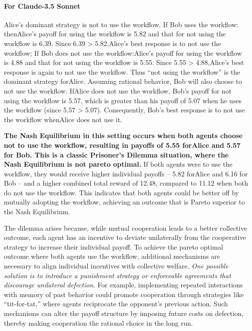 \paragraph{For Claude-3.5 Sonnet}Alice's dominant strategy is not to use the workflow. If Bob uses the workflow: thenAlice's payoff for using the workflow is 5.82 and that for not using the workflow is 6.39. Since 6.39 > 5.82,Alice's best response is to not use the workflow; If Bob does not use the workflow:Alice's payoff for using the workflow is 4.88 and that for not using the workflow is 5.55. Since 5.55 > 4.88,Alice's best response is again to not use the workflow. Thus ``not using the workflow'' is the dominant strategy forAlice. Assuming rational behavior, Bob will also choose to not use the workflow. IfAlice does not use the workflow, Bob's payoff for not using the workflow is 5.57, which is greater than his payoff of 5.07 when he uses the workflow (since 5.57 > 5.07). Consequently, Bob's best response is to not use the workflow whenAlice does not use it. 

\textbf{The Nash Equilibrium in this setting occurs when both agents choose not to use the workflow, resulting in payoffs of 5.55 forAlice and 5.57 for Bob. This is a classic Prisoner's Dilemma situation, where the Nash Equilibrium is not pareto optimal.} If both agents were to use the workflow, they would receive higher individual payoffs -- 5.82 forAlice and 6.16 for Bob -- and a higher combined total reward of 12.48, compared to 11.12 when both do not use the workflow. This indicates that both agents could be better off by mutually adopting the workflow, achieving an outcome that is Pareto superior to the Nash Equilibrium.

The dilemma arises because, while mutual cooperation leads to a better collective outcome, each agent has an incentive to deviate unilaterally from the cooperative strategy to increase their individual payoff. To achieve the pareto optimal outcome where both agents use the workflow, additional mechanisms are necessary to align individual incentives with collective welfare. \textit{One possible solution is to introduce a punishment strategy or enforceable agreements that discourage unilateral defection.} For example, implementing repeated interactions with memory of past behavior could promote cooperation through strategies like ``tit-for-tat,'' where agents reciprocate the opponent's previous action. Such mechanisms can alter the payoff structure by imposing future costs on defection, thereby making cooperation the rational choice in the long run.


